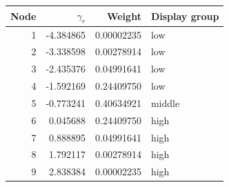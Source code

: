 \begin{longtable}{rrrl}\toprule Node & $\gamma_r$ & Weight & Display group\\\midrule
1 & -4.384865 & 0.00002235 & low \\
2 & -3.338598 & 0.00278914 & low \\
3 & -2.435376 & 0.04991641 & low \\
4 & -1.592169 & 0.24409750 & low \\
5 & -0.773241 & 0.40634921 & middle \\
6 & 0.045688 & 0.24409750 & high \\
7 & 0.888895 & 0.04991641 & high \\
8 & 1.792117 & 0.00278914 & high \\
9 & 2.838384 & 0.00002235 & high \\
\bottomrule\end{longtable}
